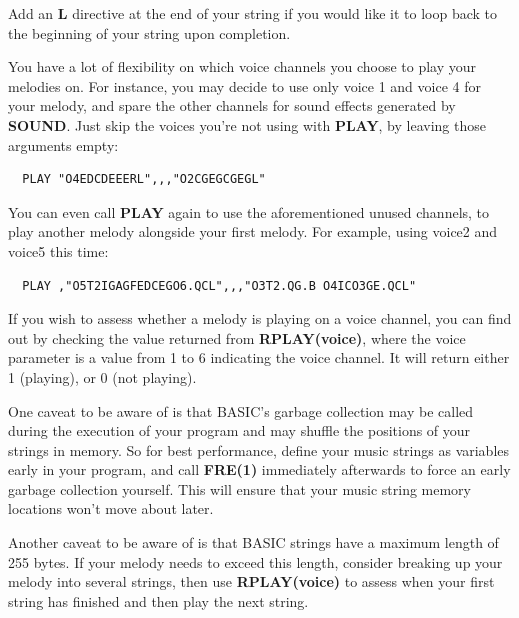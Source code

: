 \begin{description}[leftmargin=2cm,style=nextline]
  Add an {\bf L} directive at the end of your string if you would like it to loop back to the
  beginning of your string upon completion.

  You have a lot of flexibility on which voice channels you choose to play your melodies on.
  For instance, you may decide to use only voice 1 and voice 4 for your melody, and spare
  the other channels for sound effects generated by {\bf SOUND}. Just skip the voices
  you're not using with {\bf PLAY}, by leaving those arguments empty:

\begin{tcolorbox}[colback=black,coltext=white]
\verbatimfont{\codefont}
\begin{verbatim}
  PLAY "O4EDCDEEERL",,,"O2CGEGCGEGL"
\end{verbatim}
\end{tcolorbox}

  You can even call {\bf PLAY} again to use the aforementioned unused channels, to play another melody
  alongside your first melody. For example, using voice2 and voice5 this time:

\begin{tcolorbox}[colback=black,coltext=white]
\verbatimfont{\codefont}
\begin{verbatim}
  PLAY ,"O5T2IGAGFEDCEGO6.QCL",,,"O3T2.QG.B O4ICO3GE.QCL"
\end{verbatim}
\end{tcolorbox}

  If you wish to assess whether a melody is playing on a voice channel, you can
  find out by checking the value returned from {\bf RPLAY(voice)}, where the voice parameter
  is a value from 1 to 6 indicating the voice channel. It will return either 1 (playing),
  or 0 (not playing).

  One caveat to be aware of is that BASIC's garbage collection may be called during the
  execution of your program and may shuffle the positions of your strings in memory.
  So for best performance, define your music strings as variables early in your program,
  and call {\bf FRE(1)} immediately afterwards to force an early garbage collection yourself.
  This will ensure that your music string memory locations won't move about later.

  Another caveat to be aware of is that BASIC strings have a maximum length of 255 bytes.
  If your melody needs to exceed this length, consider breaking up your melody into several
  strings, then use {\bf RPLAY(voice)} to assess when your first string has finished and then
  play the next string.


\end{description}
